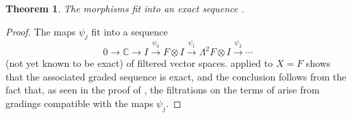 \documentclass[11pt]{article}
\theoremstyle{plain}
\newtheorem{theorem}[lemma]{Theorem}
\theoremstyle{nonumberplain}
\theoremstyle{plain}
\numberwithin{equation}{section}
\theoremstyle{nonumberplain}
\newtheorem{proof}{Proof}
\newcommand\bC{{\mathbb C}}
\newcommand\1{{\bf 1}}
\begin{document}
\begin{theorem}\label{th:injresc}
  The morphisms  fit into an exact sequence . 
\end{theorem}
\begin{proof}
  The maps $\psi_j$ fit into a sequence 
  \begin{equation}\label{eq:targetseq}
    0\to \bC\to I\stackrel{\psi_0}{\longrightarrow} F\otimes I\stackrel{\psi_1}{\longrightarrow} \Lambda^2 F\otimes I\stackrel{\psi_2}{\longrightarrow} \cdots
  \end{equation}
  (not yet known to be exact) of filtered vector spaces.  applied to $X=F$ shows that the associated graded sequence is exact, and the conclusion follows from the fact that, as seen in the proof of , the filtrations on the terms of  arise from gradings compatible with the maps $\psi_j$. 
\end{proof}

  
  
\end{document}
